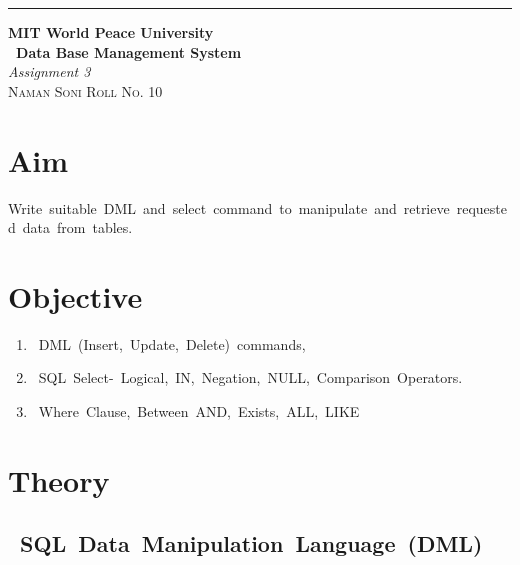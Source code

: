 \documentclass{article}
\begin{document}
	\begin{titlepage} %
		
		\raggedleft\rule{1pt}{\textheight} %
		\hspace{0.05\textwidth} %
		\parbox[b]{0.75\textwidth}
		{ %
			
			{\Huge\bfseries MIT World Peace University \\[0.5\baselineskip] \ Data Base Management System}\\[2\baselineskip] %
			{\large\textit{Assignment 3}}\\[4\baselineskip] %
			{\Large\textsc{Naman Soni Roll No. 10}} %
			
			\vspace{0.5\textheight} %
		}
		
	\end{titlepage}
	\tableofcontents
	\pagebreak
	\section{\textbf{Aim}} 
	Write suitable DML and select command to manipulate and retrieve requested data from tables. 
	
	\section{\textbf{Objective}} 
	\begin{enumerate} 
		\item DML (Insert, Update, Delete) commands, 
		\item SQL Select- Logical, IN, Negation, NULL, Comparison Operators. 
		\item Where Clause, Between AND, Exists, ALL, LIKE 
	\end{enumerate} 
	
	\section{\textbf{Theory}} 
	
	\subsection{\textbf{ SQL Data Manipulation Language (DML)}} 
\end{document}
